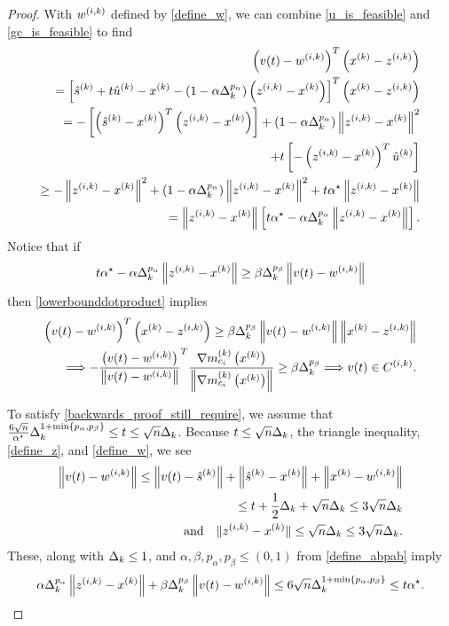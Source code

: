 \begin{proof}
With ${w^{(i, k)}}$ defined by \cref{define_w}, we can combine \cref{u_is_feasible} and \cref{gc_is_feasible} to find
\begin{align}
\left(v(t) - {w^{(i, k)}} \right)^T\left(x^{(k)} - {z^{(i, k)}} \right) \nonumber \\
=\left[ {{\hat s}^{(k)}}  + t{{\hat u}^{(k)}} - x^{(k)} - \left(1 - \alpha\Delta_k^{p_{\alpha}}\right)\left({z^{(i, k)}} - x^{(k)}\right) \right]^T\left(x^{(k)} - {z^{(i, k)}} \right) \nonumber \\
=- \left[
\left( {{\hat s}^{(k)}}  - x^{(k)}\right)^T\left({z^{(i, k)}} - x^{(k)} \right)
\right]
+\left(1 - \alpha\Delta_k^{p_{\alpha}}\right)\left\|{z^{(i, k)}} - x^{(k)}\right\|^2 \nonumber \\
+ t\left[ -\left({z^{(i, k)}} - x^{(k)}\right)^T{{\hat u}^{(k)}}\right] \nonumber \\
\ge 
-\left\|{z^{(i, k)}} - x^{(k)}\right\|^2
+\left(1 - \alpha\Delta_k^{p_{\alpha}}\right)\left\|{z^{(i, k)}} - x^{(k)}\right\|^2
+ t{ \alpha^{\star} } \left\|{z^{(i, k)}} - x^{(k)}\right\| \nonumber \\
= \left\|{z^{(i, k)}} - x^{(k)}\right\|
\left[
t{ \alpha^{\star} }
- \alpha\Delta_k^{p_{\alpha}} \left\|{z^{(i, k)}} - x^{(k)}\right\|
\right]. \label{lowerbounddotproduct}
\end{align}
Notice that if
\begin{align}
t{ \alpha^{\star} } - \alpha\Delta_k^{p_{\alpha}} \left\|{z^{(i, k)}} - x^{(k)}\right\| \ge \beta \Delta_k^{p_{\beta}} \left\|v(t) - {w^{(i, k)}}\right\| \label{backwards_proof_still_require}
\end{align}
then \cref{lowerbounddotproduct} implies
\begin{align*}
\left(v(t) - {w^{(i, k)}} \right)^T\left(x^{(k)} - {z^{(i, k)}} \right) \ge \beta \Delta_k^{p_{\beta}}\left\|v(t) - {w^{(i, k)}}\right\| \left\|x^{(k)} - {z^{(i, k)}}\right\| \\
\Longrightarrow -\frac {\left(v(t) - {w^{(i, k)}} \right)}{\left\|v(t) - {w^{(i, k)}} \right\|}^T\frac{{\nabla m_{c_i}^{(k)}\left(x^{(k)}\right)}}{\left\|{\nabla m_{c_i}^{(k)}\left(x^{(k)}\right)}\right\|}\ge\beta \Delta_k^{p_{\beta}} 
\Longrightarrow v(t) \in {C^{(i, k)}}.
\end{align*}

To satisfy \cref{backwards_proof_still_require}, we assume that 
$\frac{6 \sqrt{n}}{{ \alpha^{\star} }} \Delta_k^{1 + \min\left\{p_{\alpha}, p_{\beta}\right\}} \le t \le \sqrt{n}\Delta_k$.
Because $t \le \sqrt{n} \Delta_k$, the triangle inequality, \cref{define_z}, and \cref{define_w}, we see
\begin{align*}
\left\|v(t) - {w^{(i, k)}}\right\| \le \left\|v(t) - {{\hat s}^{(k)}} \right\| + \left\|{{\hat s}^{(k)}}  - x^{(k)} \right\| + \left\|x^{(k)} - {w^{(i, k)}}\right\| \\
\le t + \frac 1 2 \Delta_k + \sqrt{n}\Delta_k 
\le 3\sqrt{n}\Delta_k  \\
\textrm{and} \quad \|{z^{(i, k)}} - x^{(k)} \| \le \sqrt{n}\Delta_k \le 3\sqrt{n}\Delta_k.
\end{align*}
These, along with $\Delta_k \le 1$, and $\alpha, \beta, p_{\alpha}, p_{\beta} \le (0, 1)$ from \cref{define_abpab} imply
\begin{align*}
\alpha\Delta_k^{p_{\alpha}} \left\|{z^{(i, k)}} - x^{(k)}\right\| + \beta \Delta_k^{p_{\beta}} \left\|v(t) - {w^{(i, k)}}\right\| 
\le 6 \sqrt{n} \Delta_k^{1 + \min\left\{p_{\alpha}, p_{\beta}\right\}} \le t { \alpha^{\star} }.
\end{align*}


\end{proof}
